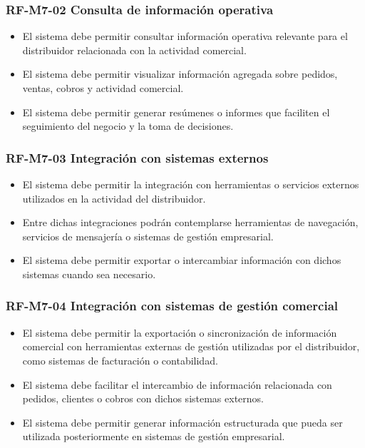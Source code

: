 \vspace{-0.75em}
\subsubsection{RF-M7-02 Consulta de información operativa}
\vspace{-1em}

\begin{itemize}
    \item El sistema debe permitir consultar información operativa relevante para el distribuidor relacionada con la actividad comercial.
    \item El sistema debe permitir visualizar información agregada sobre pedidos, ventas, cobros y actividad comercial.
    \item El sistema debe permitir generar resúmenes o informes que faciliten el seguimiento del negocio y la toma de decisiones.
\end{itemize}

\vspace{-0.75em}
\subsubsection{RF-M7-03 Integración con sistemas externos}
\vspace{-1em}

\begin{itemize}
    \item El sistema debe permitir la integración con herramientas o servicios externos utilizados en la actividad del distribuidor.
    \item Entre dichas integraciones podrán contemplarse herramientas de navegación, servicios de mensajería o sistemas de gestión empresarial.
    \item El sistema debe permitir exportar o intercambiar información con dichos sistemas cuando sea necesario.
\end{itemize}

\vspace{-0.75em}
\subsubsection{RF-M7-04 Integración con sistemas de gestión comercial}
\vspace{-1em}

\begin{itemize}
    \item El sistema debe permitir la exportación o sincronización de información comercial con herramientas externas de gestión utilizadas por el distribuidor, como sistemas de facturación o contabilidad.
    \item El sistema debe facilitar el intercambio de información relacionada con pedidos, clientes o cobros con dichos sistemas externos.
    \item El sistema debe permitir generar información estructurada que pueda ser utilizada posteriormente en sistemas de gestión empresarial.
\end{itemize}

